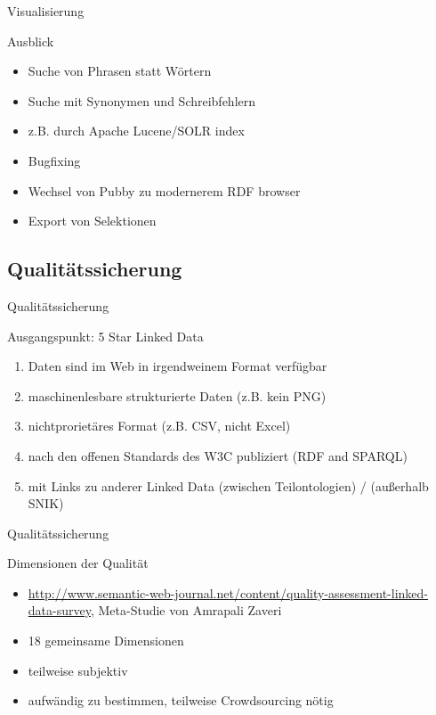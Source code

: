 \documentclass[14pt,aspectratio=1610]{beamer}
\newcommand{\xmark}{\ding{55}}%
\begin{document}
\begin{frame}{Visualisierung}
\begin{block}{Ausblick}
\begin{itemize}
\item Suche von Phrasen statt Wörtern
\item Suche mit Synonymen und Schreibfehlern
\item z.B. durch Apache Lucene/SOLR index
\item Bugfixing
\item Wechsel von Pubby zu modernerem RDF browser
\item Export von Selektionen
\end{itemize}
\end{block}
\end{frame}

\subsection{Qualitätssicherung}%

\begin{frame}{Qualitätssicherung}
\begin{block}{Ausgangspunkt: 5 Star Linked Data}
\begin{enumerate}
\item Daten sind im Web in irgendweinem Format verfügbar \checkmark{}
\item maschinenlesbare strukturierte Daten (z.B. kein PNG) \checkmark{}
\item nichtprorietäres Format (z.B. CSV, nicht Excel) \checkmark{}	
\item nach den offenen Standards des W3C publiziert (RDF and SPARQL) \checkmark{}
\item mit Links zu anderer Linked Data \checkmark (zwischen Teilontologien) / \xmark{} (außerhalb SNIK)
\end{enumerate}
\end{block}
\end{frame}

\begin{frame}{Qualitätssicherung}
\begin{block}{Dimensionen der Qualität}
\begin{itemize}
\item \href{Quality Assessment for Linked Data: A Survey}{http://www.semantic-web-journal.net/content/quality-assessment-linked-data-survey}, Meta-Studie von Amrapali Zaveri
\item 18 gemeinsame Dimensionen
\item teilweise subjektiv
\item aufwändig zu bestimmen, teilweise Crowdsourcing nötig
\end{itemize}
\end{block}
\end{frame}
\end{document}

